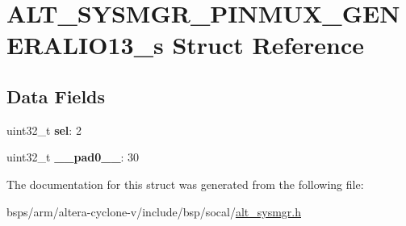 \hypertarget{structALT__SYSMGR__PINMUX__GENERALIO13__s}{}\section{A\+L\+T\+\_\+\+S\+Y\+S\+M\+G\+R\+\_\+\+P\+I\+N\+M\+U\+X\+\_\+\+G\+E\+N\+E\+R\+A\+L\+I\+O13\+\_\+s Struct Reference}
\label{structALT__SYSMGR__PINMUX__GENERALIO13__s}
\subsection*{Data Fields}
\begin{DoxyCompactItemize}
\item 
\mbox{\label{structALT__SYSMGR__PINMUX__GENERALIO13__s_a25b4936d6558c490365bf10db3ca506a}} 
uint32\+\_\+t {\bfseries sel}\+: 2
\item 
\mbox{\label{structALT__SYSMGR__PINMUX__GENERALIO13__s_aea3bd426275d8597eb6e960c2b2ff821}} 
uint32\+\_\+t {\bfseries \+\_\+\+\_\+pad0\+\_\+\+\_\+}\+: 30
\end{DoxyCompactItemize}


The documentation for this struct was generated from the following file\+:\begin{DoxyCompactItemize}
\item 
bsps/arm/altera-\/cyclone-\/v/include/bsp/socal/\mbox{\hyperlink{alt__sysmgr_8h}{alt\+\_\+sysmgr.\+h}}\end{DoxyCompactItemize}
